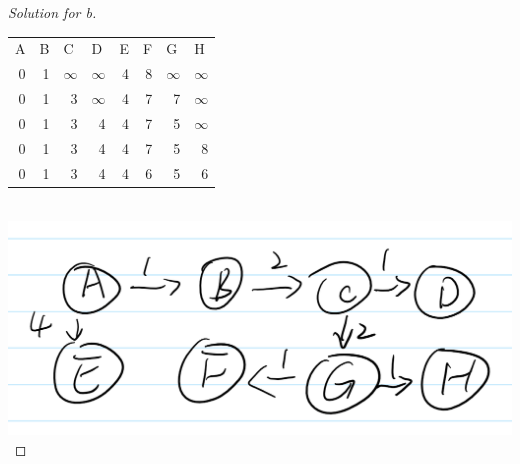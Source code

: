 \documentclass[12pt]{article}
\begin{document}
\begin{proof}[Solution for b]
    \begin{tabular}{rrrrrrrr}
	\multicolumn{1}{l}{A} & \multicolumn{1}{l}{B} & \multicolumn{1}{l}{C} & \multicolumn{1}{l}{D} & \multicolumn{1}{l}{E} & \multicolumn{1}{l}{F} & \multicolumn{1}{l}{G} & \multicolumn{1}{l}{H} \\
	0     & 1     & \multicolumn{1}{l}{\textcolor[rgb]{ .2,  .2,  .2}{$\infty$}} & \multicolumn{1}{l}{$\infty$} & 4     & 8     & \multicolumn{1}{l}{$\infty$} & \multicolumn{1}{l}{$\infty$} \\
	0     & 1     & 3     & \multicolumn{1}{l}{$\infty$} & 4     & 7     & 7     & \multicolumn{1}{l}{$\infty$} \\
	0     & 1     & 3     & 4     & 4     & 7     & 5     & \multicolumn{1}{l}{$\infty$} \\
	0     & 1     & 3     & 4     & 4     & 7     & 5     & 8 \\
	0     & 1     & 3     & 4     & 4     & 6     & 5     & 6 \\
\end{tabular}\\
\includegraphics[scale=0.2]{1_9.png}
\end{proof}
\end{document}
